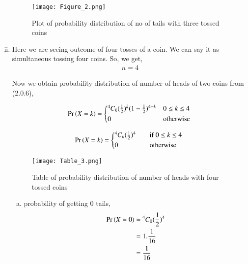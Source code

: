 \documentclass[journal,12pt,twocolumn]{IEEEtran}
\begin{document}
\begin{enumerate}[(i)]
\begin{figure}[h!]
    \centering
    \texttt{[image: Figure\_2.png]}
    \caption{Plot of probability distribution of no of tails with three tossed coins}
    \label{fig:Three coins}
\end{figure}



\item

Here we are seeing outcome of four tosses of a coin. We can say it as simultaneous tossing four coins. So, we get,
\begin{align}
    n=4
\end{align}

Now we obtain probability distribution of number of heads of two coins from (2.0.6),

\begin{align*}
   \pr{X=k} =
  \begin{cases*}
    {^4 C_k}(\frac{1}{2})^{k}(1-\frac{1}{2})^{4-k} & $0 \leq k \leq 4$\\
    0 & otherwise
  \end{cases*}
\end{align*}

\begin{align}
   \pr{X=k} =
  \begin{cases*}
    {^4 C_k}(\frac{1}{2})^{4} \quad& if $0 \leq k \leq 4$ \\
    0 \quad& otherwise
  \end{cases*}
\end{align}

\begin{figure}[h!]
    \centering
    \texttt{[image: Table\_3.png]}
    \caption{Table of probability distribution of number of heads with four tossed coins}
    \label{fig:Table_3}
\end{figure}

\begin{enumerate}[(a)]
    \item probability of getting 0 tails,
        \begin{align}
            \begin{split}
                \Pr\left(X=0\right) &= {^4C_0}(\frac{1}{2})^4\\
                &=1.\frac{1}{16}\\
                &=\frac{1}{16}
            \end{split}
        \end{align}


\end{enumerate}
\end{enumerate}
\end{document}
